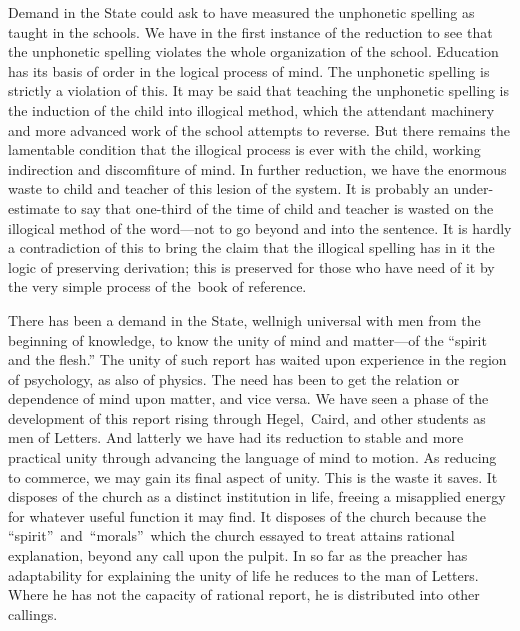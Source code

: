 \documentclass[openany,nobib]{tufte-book}
\begin{document}
Demand in the State could ask to have measured the unphonetic spelling
as taught in the schools. We have in the first instance of the reduction
to see that the unphonetic spelling violates the whole organization of
the school. Education has its basis of order in the logical process of
mind. The unphonetic spelling is strictly a violation of this. It may be
said that teaching the unphonetic spelling is the induction of the child
into illogical method, which the attendant machinery and more advanced
work of the school attempts to reverse. But there remains the lamentable
condition that the illogical process is ever with the child, working
indirection and discomfiture of mind. In further reduction, we have the
enormous waste to child and teacher of this lesion of the system. It is
probably an under-estimate to say that one-third of the time of child
and teacher is wasted on the illogical method of the word---not to go
beyond and into the sentence. It is hardly a contradiction of this to
bring the claim that the illogical spelling has in it the logic of
preserving derivation; this is preserved for those who have need of it
by the very simple process of the~book of reference.~

There has been a demand in the State, wellnigh universal with men from
the beginning of knowledge, to know the unity of mind and matter---of
the ``spirit and the flesh.'' The unity of such report has waited upon
experience in the region of psychology, as also of physics. The need has
been to get the relation or dependence of mind upon matter, and vice
versa. We have seen a phase of the development of this report rising
through Hegel,~Caird, and other students as men of Letters. And latterly
we have had its reduction to stable and more practical unity through
advancing the language of mind to motion. As reducing to commerce, we
may gain its final aspect of unity. This is the waste it saves. It
disposes of the church as a distinct institution in life, freeing a
misapplied energy for whatever useful function it may find. It disposes
of the church because the ``spirit''~and~``morals''~which the church
essayed to treat attains rational explanation, beyond any call upon the
pulpit. In so far as the preacher has adaptability for explaining the
unity of life he reduces to the man of Letters. Where he has not the
capacity of rational report, he is distributed into other callings.~

\vspace{0.05in}
\end{document}
